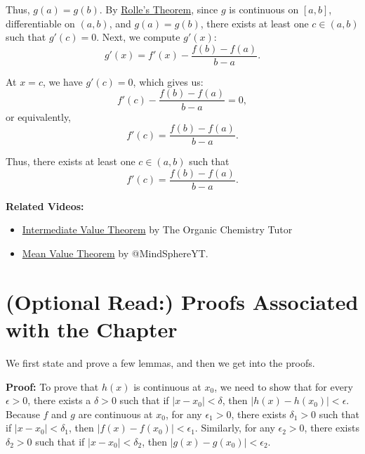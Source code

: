 Thus, \( g(a) = g(b) \). By \href{https://en.wikipedia.org/wiki/Rolle%27s_theorem}{Rolle's Theorem}, since \( g \) is continuous on \([a, b]\), differentiable on \((a, b)\), and \( g(a) = g(b) \), there exists at least one \( c \in (a, b) \) such that \( g'(c) = 0 \). Next, we compute \( g'(x) \):
\[
g'(x) = f'(x) - \frac{f(b) - f(a)}{b - a}.
\]

At \( x = c \), we have \( g'(c) = 0 \), which gives us:
\[
f'(c) - \frac{f(b) - f(a)}{b - a} = 0,
\]
or equivalently,
\[
f'(c) = \frac{f(b) - f(a)}{b - a}.
\]

Thus, there exists at least one \( c \in (a, b) \) such that
\[
f'(c) = \frac{f(b) - f(a)}{b - a}.
\]
\Qed

\textbf{Related Videos:}
\begin{itemize}
    \item \href{https://www.youtube.com/watch?v=4L9ffuwj4Lk}{Intermediate Value Theorem} by The Organic Chemistry Tutor

    \item \href{https://www.youtube.com/shorts/EnVN3_lbsGQ}{Mean Value Theorem} by 
@MindSphereYT.
\end{itemize}


\section{(Optional Read:) Proofs Associated with the Chapter}
\label{sec:ProofsChap04}

\bigskip

We first state and prove a few lemmas, and then we get into the proofs. \\


\textbf{Proof:} To prove that \(h(x)\) is continuous at \(x_0\), we need to show that for every \(\epsilon > 0\), there exists a \(\delta > 0\) such that if \(|x - x_0| < \delta\), then \(|h(x) - h(x_0)| < \epsilon\).\\

Because \(f\) and \(g\) are continuous at \(x_0\), for any \(\epsilon_1 > 0\), there exists \(\delta_1 > 0\) such that if \(|x - x_0| < \delta_1\), then \(|f(x) - f(x_0)| < \epsilon_1\). Similarly, for any \(\epsilon_2 > 0\), there exists \(\delta_2 > 0\) such that if \(|x - x_0| < \delta_2\), then \(|g(x) - g(x_0)| < \epsilon_2\).\\


